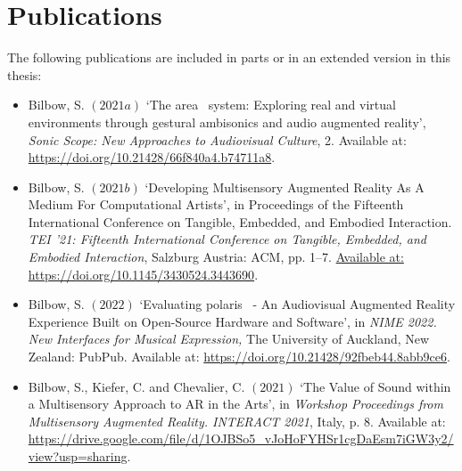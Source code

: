 \chapter*{Publications}

The following publications are included in parts or in an extended version in
this thesis:
\begin{itemize}
    \item Bilbow, S. $(2021a)$ `The area~ system: Exploring real and virtual environments through gestural ambisonics and audio augmented reality', \textit{Sonic Scope: New Approaches to Audiovisual Culture}, 2. Available at: \url{https://doi.org/10.21428/66f840a4.b74711a8}.
    \item Bilbow, S. $(2021b)$ `Developing Multisensory Augmented Reality As A Medium For Computational Artists', in Proceedings of the Fifteenth International Conference on Tangible, Embedded, and Embodied Interaction. \textit{TEI '21: Fifteenth International Conference on Tangible, Embedded, and Embodied Interaction}, Salzburg Austria: ACM, pp. 1–7. \url{Available at: https://doi.org/10.1145/3430524.3443690}.
    \item Bilbow, S. $(2022)$ `Evaluating polaris~ - An Audiovisual Augmented Reality Experience Built on Open-Source Hardware and Software', in \textit{NIME 2022. New Interfaces for Musical Expression,} The University of Auckland, New Zealand: PubPub. Available at: \url{https://doi.org/10.21428/92fbeb44.8abb9ce6}.
    \item Bilbow, S., Kiefer, C. and Chevalier, C. $(2021)$ `The Value of Sound within a Multisensory Approach to AR in the Arts', in \textit{Workshop Proceedings from Multisensory Augmented Reality. INTERACT 2021}, Italy, p. 8. Available at: \url{https://drive.google.com/file/d/1OJBSo5_vJoHoFYHSr1cgDaEsm7iGW3y2/view?usp=sharing}.
\end{itemize}
